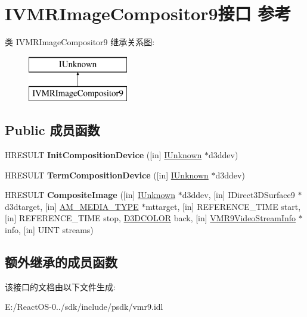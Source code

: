 \hypertarget{interface_i_v_m_r_image_compositor9}{}\section{I\+V\+M\+R\+Image\+Compositor9接口 参考}
\label{interface_i_v_m_r_image_compositor9}
类 I\+V\+M\+R\+Image\+Compositor9 继承关系图\+:\begin{figure}[H]
\begin{center}
\leavevmode
\includegraphics[height=2.000000cm]{interface_i_v_m_r_image_compositor9}
\end{center}
\end{figure}
\subsection*{Public 成员函数}
\begin{DoxyCompactItemize}
\item 
\mbox{\label{interface_i_v_m_r_image_compositor9_a9a0056b95b33ec981a0bfd93b9e7d972}} 
H\+R\+E\+S\+U\+LT {\bfseries Init\+Composition\+Device} (\mbox{[}in\mbox{]} \hyperlink{interface_i_unknown}{I\+Unknown} $\ast$d3ddev)
\item 
\mbox{\label{interface_i_v_m_r_image_compositor9_a2b369b925a4812fa454bf667d4957120}} 
H\+R\+E\+S\+U\+LT {\bfseries Term\+Composition\+Device} (\mbox{[}in\mbox{]} \hyperlink{interface_i_unknown}{I\+Unknown} $\ast$d3ddev)
\item 
\mbox{\label{interface_i_v_m_r_image_compositor9_a45b75c4a042bdbc3c2378e02dd3c7e50}} 
H\+R\+E\+S\+U\+LT {\bfseries Composite\+Image} (\mbox{[}in\mbox{]} \hyperlink{interface_i_unknown}{I\+Unknown} $\ast$d3ddev, \mbox{[}in\mbox{]} I\+Direct3\+D\+Surface9 $\ast$d3dtarget, \mbox{[}in\mbox{]} \hyperlink{struct_a_m___m_e_d_i_a___t_y_p_e}{A\+M\+\_\+\+M\+E\+D\+I\+A\+\_\+\+T\+Y\+PE} $\ast$mttarget, \mbox{[}in\mbox{]} R\+E\+F\+E\+R\+E\+N\+C\+E\+\_\+\+T\+I\+ME start, \mbox{[}in\mbox{]} R\+E\+F\+E\+R\+E\+N\+C\+E\+\_\+\+T\+I\+ME stop, \hyperlink{struct_d3_d_c_o_l_o_r}{D3\+D\+C\+O\+L\+OR} back, \mbox{[}in\mbox{]} \hyperlink{struct___v_m_r9_video_stream_info}{V\+M\+R9\+Video\+Stream\+Info} $\ast$info, \mbox{[}in\mbox{]} U\+I\+NT streams)
\end{DoxyCompactItemize}
\subsection*{额外继承的成员函数}


该接口的文档由以下文件生成\+:\begin{DoxyCompactItemize}
\item 
E\+:/\+React\+O\+S-\/0../sdk/include/psdk/vmr9.\+idl\end{DoxyCompactItemize}
